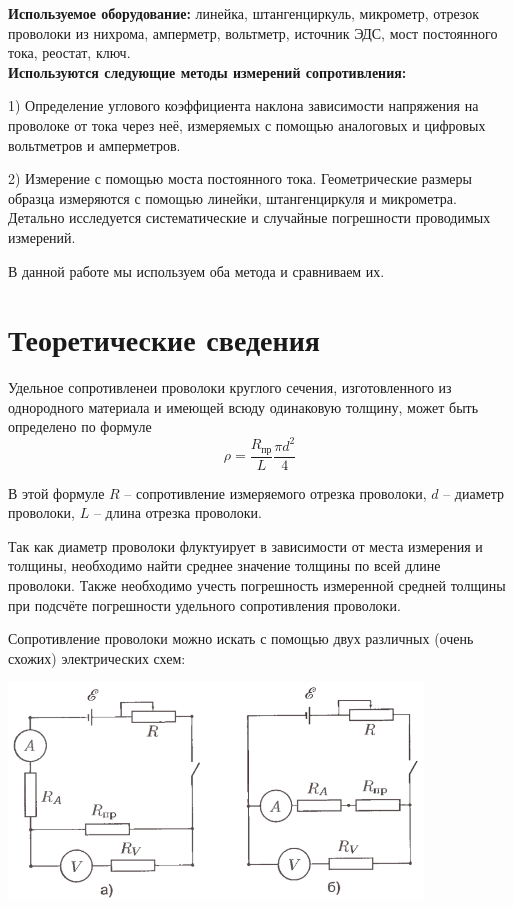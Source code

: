 \documentclass[a4paper, 12pt]{article} %
\begin{document}
\textbf{Используемое оборудование:} линейка, штангенциркуль, микрометр, отрезок проволоки из нихрома, амперметр, вольтметр, источник ЭДС, мост постоянного тока, реостат, ключ.\\

\textbf{Используются следующие методы измерений сопротивления:} 

1) Определение углового коэффициента наклона зависимости напряжения на проволоке от тока через неё, измеряемых с помощью аналоговых и цифровых вольтметров и амперметров.

2) Измерение с помощью моста постоянного тока. Геометрические размеры образца измеряются с помощью линейки, штангенциркуля и микрометра. Детально исследуется систематические и случайные погрешности проводимых измерений.

В данной работе мы используем оба метода и сравниваем их.\\


\section{Теоретические сведения}

Удельное сопротивленеи проволоки круглого сечения, изготовленного из однородного материала и имеющей всюду одинаковую толщину, может быть определено по формуле
\[\rho = \frac{R_{\text{пр}}}{L} \frac{\pi d^2}{4}\]

В этой формуле $R$ -- сопротивление измеряемого отрезка проволоки, $d$ -- диаметр проволоки, $L$ -- длина отрезка проволоки.

Так как диаметр проволоки флуктуирует в зависимости от места измерения и толщины, необходимо найти среднее значение толщины по всей длине проволоки. Также необходимо учесть погрешность измеренной средней толщины при подсчёте погрешности удельного сопротивления проволоки.

Сопротивление проволоки можно искать с помощью двух различных (очень схожих) электрических схем:
\begin{center}
    {\includegraphics[width=11cm]{1}}
\end{center}
\end{document}
